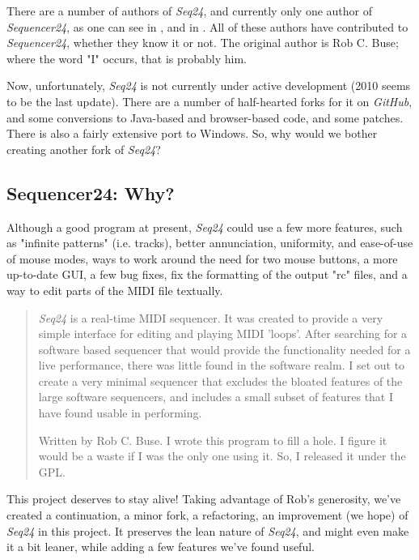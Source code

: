 \documentclass[
 11pt,
 twoside,
 a4paper,
 headinclude,
 footinclude,
 final                                 %
]{article}
\begin{document}
   There are a number of authors of \textsl{Seq24}, and currently only
   one author of \textsl{Sequencer24},
   as one can see in ,
   and in .
   All of these authors have contributed to \textsl{Sequencer24}, whether
   they know it or not.
   The original author is Rob C. Buse; where the word "I" occurs, that is
   probably him.

   Now, unfortunately, \textsl{Seq24} is not currently under active
   development (2010 seems to be the last update).  There are a number of
   half-hearted forks for it on \textsl{GitHub}, and some conversions
   to Java-based and browser-based code, and some patches.
   There is also a fairly extensive port to Windows.
   So, why would we bother creating another fork of \textsl{Seq24}?

\subsection{Sequencer24: Why?}
\label{subsec:introduction_seq24_vs_others}

   Although a good program at present, \textsl{Seq24} could use a few more
   features, such as "infinite patterns" (i.e. tracks), better annunciation,
   uniformity, and ease-of-use
   of mouse modes, ways to work around the need for two mouse buttons, a more
   up-to-date GUI, a few bug fixes, fix the formatting of the output "rc"
   files, and a way to edit parts of the MIDI file textually.

   \begin{quotation}
      \textsl{Seq24} is a real-time MIDI sequencer. It was created to
      provide a very simple interface for editing and playing MIDI 'loops'.
      After searching for a software based sequencer that would provide the
      functionality needed for a live performance, there was little found in
      the software realm. I set out to create a very minimal sequencer that
      excludes the bloated features of the large software sequencers, and
      includes a small subset of features that I have found usable in
      performing. 

      Written by Rob C. Buse.  I wrote this program to fill a
      hole.  I figure it would be a waste if I was the only one
      using it.  So, I released it under the GPL.
   \end{quotation}

   This project deserves to stay alive!
   Taking advantage of Rob's generosity, we've created a continuation,
   a minor fork, a refactoring, an improvement (we hope) of
   \textsl{Seq24} in this project.  It preserves the lean nature of
   \textsl{Seq24}, and might even make it a bit leaner, while adding a few
   features we've found useful.
   
\end{document}
